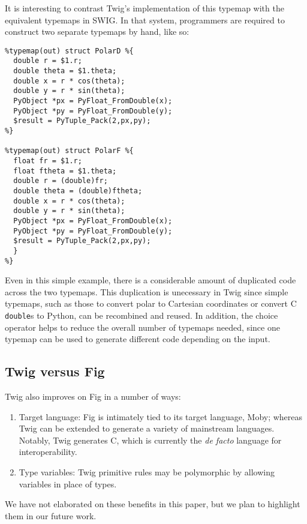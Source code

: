 It is interesting to contrast Twig's implementation of this typemap with the equivalent typemaps in SWIG. In that system, programmers are required to construct two separate typemaps by hand, like so:

\begin{verbatim}
%typemap(out) struct PolarD %{
  double r = $1.r;
  double theta = $1.theta;
  double x = r * cos(theta);
  double y = r * sin(theta);
  PyObject *px = PyFloat_FromDouble(x);
  PyObject *py = PyFloat_FromDouble(y);
  $result = PyTuple_Pack(2,px,py);
%}

%typemap(out) struct PolarF %{
  float fr = $1.r;
  float ftheta = $1.theta;
  double r = (double)fr;
  double theta = (double)ftheta;
  double x = r * cos(theta);
  double y = r * sin(theta);
  PyObject *px = PyFloat_FromDouble(x);
  PyObject *py = PyFloat_FromDouble(y);
  $result = PyTuple_Pack(2,px,py);
  }
%}
\end{verbatim}

Even in this simple example, there is a considerable amount of duplicated code across the two typemaps. This duplication is unecessary in Twig since simple typemaps, such as those to convert polar to Cartesian coordinates or convert C \texttt{double}s to Python, can be recombined and reused. In addition, the choice operator helps to reduce the overall number of typemaps needed, since one typemap can be used to generate different code depending on the input.

\subsection{Twig versus Fig}

Twig also improves on Fig in a number of ways:

\begin{enumerate}

\item Target language: Fig is intimately tied to its target language, Moby; whereas Twig can be extended to generate a variety of mainstream languages. Notably, Twig generates C, which is currently the \emph{de facto} language for interoperability.

\item Type variables: Twig primitive rules may be polymorphic by allowing variables in place of types.

\end{enumerate}

We have not elaborated on these benefits in this paper, but we plan to highlight them in our future work.
